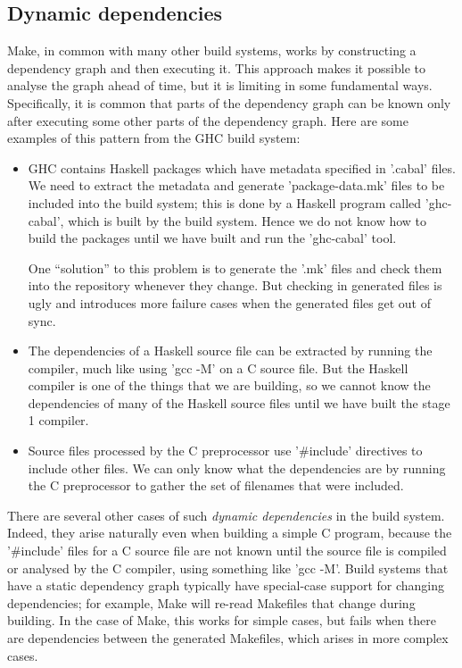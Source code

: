 \subsection{Dynamic dependencies\label{sec:dynamic-deps}}

Make, in common with many other build systems, works by
constructing a dependency graph and then executing it. This approach
makes it possible to analyse the graph ahead of
time, but it is limiting in some fundamental ways.  Specifically,
it is common that parts of the dependency graph can be known only after
executing some other parts of the dependency graph.  Here are some examples of
this pattern from the GHC build system:

\begin{itemize}
\item GHC contains Haskell packages which have metadata specified in
  \lst'.cabal' files. We need to extract the metadata and generate
  \lst'package-data.mk' files to be included into the build system; this
  is done by a Haskell program called \lst'ghc-cabal', which is built by the
  build system. Hence we do not know how to build the packages until we have
  built and run the \lst'ghc-cabal' tool.

  One ``solution'' to this problem is to generate the \lst'.mk'
  files and check them into the repository whenever they change. But
  checking in generated files is ugly and introduces more failure
  cases when the generated files get out of sync.

\item The dependencies of a Haskell source file can be extracted by
  running the compiler, much like using \lst'gcc -M' on a C source
  file.  But the Haskell compiler is one of the things that we are
  building, so we cannot know the dependencies of many of the Haskell
  source files until we have built the stage 1 compiler.

\item Source files processed by the C preprocessor use
  \lst'#include' directives to include other files.  We can only
  know what the dependencies are by running the C preprocessor to
  gather the set of filenames that were included.
\end{itemize}
\noindent
There are several other cases of such \emph{dynamic dependencies} in the build
system. Indeed, they arise naturally even when building a simple C program,
because the \lst'#include' files for a C source file are not known until the
source file is compiled or analysed by the C compiler, using something like
\lst'gcc -M'. Build systems that have a static dependency graph typically have
special-case support for changing dependencies; for example, Make will re-read
Makefiles that change during building.  In the case of Make,
this works for simple cases, but fails when there are dependencies
between the generated Makefiles, which arises in more complex cases.

